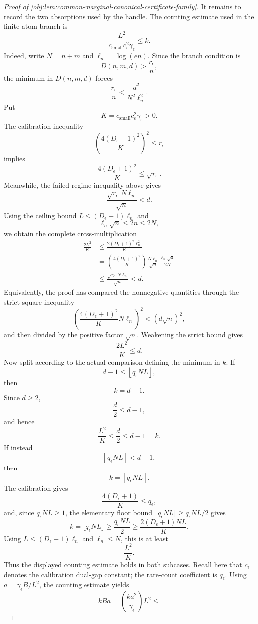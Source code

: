 \begin{proof}[Proof of \cref{obj:lem:common-marginal-canonical-certificate-family}]
It remains to record the two absorptions used by the handle.  The counting estimate used in the finite-atom branch is
\[
\frac{L^2}{c_{\mathrm{small}}c_\epsilon^2\gamma_\epsilon}\le k .
\]
Indeed, write \(N=n+m\) and \(\ell_n=\log(en)\).  Since the branch condition is
\[
D(n,m,d)>\frac{r_\epsilon}{n},
\]
the minimum in \(D(n,m,d)\) forces
\[
\frac{r_\epsilon}{n}
<
\frac{d^2}{N^2\ell_n^2}.
\]
Put
\[
K=c_{\mathrm{small}}c_\epsilon^2\gamma_\epsilon>0.
\]
The calibration inequality
\[
\left(
\frac{4(D_\epsilon+1)^2}{K}
\right)^2
\le r_\epsilon
\]
implies
\[
\frac{4(D_\epsilon+1)^2}{K}\le\sqrt{r_\epsilon}.
\]
Meanwhile, the failed-regime inequality above gives
\[
\frac{\sqrt{r_\epsilon}\,N\ell_n}{\sqrt n}<d.
\]
Using the ceiling bound \(L\le(D_\epsilon+1)\ell_n\) and
\[
\ell_n\sqrt n\le 2n\le 2N,
\]
we obtain the complete cross-multiplication
\[
\begin{aligned}
\frac{2L^2}{K}
&\le
\frac{2(D_\epsilon+1)^2\ell_n^2}{K} \\
&=
\left(\frac{4(D_\epsilon+1)^2}{K}\right)
\frac{N\ell_n}{\sqrt n}
\frac{\ell_n\sqrt n}{2N} \\
&\le
\frac{\sqrt{r_\epsilon}\,N\ell_n}{\sqrt n}
<d.
\end{aligned}
\]
Equivalently, the proof has compared the nonnegative quantities through the strict square inequality
\[
\left(\frac{4(D_\epsilon+1)^2}{K}N\ell_n\right)^2
<
(d\sqrt n)^2,
\]
and then divided by the positive factor \(\sqrt n\).  Weakening the strict bound gives
\[
\frac{2L^2}{K}
\le d.
\]
Now split according to the actual comparison defining the minimum in \(k\).  If
\[
d-1\le \left\lfloor q_\epsilon NL\right\rfloor,
\]
then
\[
k=d-1.
\]
Since \(d\ge2\),
\[
\frac d2\le d-1,
\]
and hence
\[
\frac{L^2}{K}
\le \frac d2\le d-1=k .
\]
If instead
\[
\left\lfloor q_\epsilon NL\right\rfloor<d-1,
\]
then
\[
k=\left\lfloor q_\epsilon NL\right\rfloor .
\]
The calibration gives
\[
\frac{4(D_\epsilon+1)}{K}
\le q_\epsilon,
\]
and, since \(q_\epsilon NL\ge1\), the elementary floor bound \(\lfloor q_\epsilon NL\rfloor\ge q_\epsilon NL/2\) gives
\[
k=\bigl\lfloor q_\epsilon NL\bigr\rfloor
\ge \frac{q_\epsilon NL}{2}
\ge
\frac{2(D_\epsilon+1)NL}{K}.
\]
Using \(L\le(D_\epsilon+1)\ell_n\) and \(\ell_n\le N\), this is at least
\[
\frac{L^2}{K}.
\]
Thus the displayed counting estimate holds in both subcases.  Recall here that \(c_\epsilon\) denotes the calibration dual-gap constant; the rare-count coefficient is \(q_\epsilon\).  Using \(a=\gamma_\epsilon B/L^2\), the counting estimate yields
\[
kBa
=
\left(\frac{k a^2}{\gamma_\epsilon}\right)L^2
\le
\]
\end{proof}
